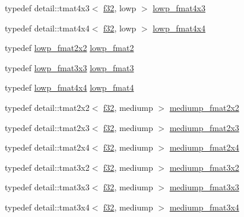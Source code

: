 \begin{CompactItemize}
\item 
typedef detail::tmat4x3$<$ \hyperlink{group__gtc__type__precision_g0ec999b57f5330d9021256e96038df04}{f32}, lowp $>$ \hyperlink{group__gtc__type__precision_ga4df4f3adcc8eb3bed680b14a87fb2c4}{lowp\_\-fmat4x3}
\item 
typedef detail::tmat4x4$<$ \hyperlink{group__gtc__type__precision_g0ec999b57f5330d9021256e96038df04}{f32}, lowp $>$ \hyperlink{group__gtc__type__precision_g9ff955b170643f547661d2e7263ee426}{lowp\_\-fmat4x4}
\item 
typedef \hyperlink{group__gtc__type__precision_g99367a30c64035d7e7f76410105d10e3}{lowp\_\-fmat2x2} \hyperlink{group__gtc__type__precision_g9bafb192cb7327d543ad55be2e6e675c}{lowp\_\-fmat2}
\item 
typedef \hyperlink{group__gtc__type__precision_g25b389b52269f3256f015b4fff5789c2}{lowp\_\-fmat3x3} \hyperlink{group__gtc__type__precision_g88ae00cab6aae48d56700915c7799973}{lowp\_\-fmat3}
\item 
typedef \hyperlink{group__gtc__type__precision_g9ff955b170643f547661d2e7263ee426}{lowp\_\-fmat4x4} \hyperlink{group__gtc__type__precision_g00dfb85ec53bb5f173747f73d13c1b8b}{lowp\_\-fmat4}
\item 
typedef detail::tmat2x2$<$ \hyperlink{group__gtc__type__precision_g0ec999b57f5330d9021256e96038df04}{f32}, mediump $>$ \hyperlink{group__gtc__type__precision_ge9af1d96efbaeeb5c5edd9c7b0a24fa5}{mediump\_\-fmat2x2}
\item 
typedef detail::tmat2x3$<$ \hyperlink{group__gtc__type__precision_g0ec999b57f5330d9021256e96038df04}{f32}, mediump $>$ \hyperlink{group__gtc__type__precision_gae7081e19f495e7cdbf727e1550b95a8}{mediump\_\-fmat2x3}
\item 
typedef detail::tmat2x4$<$ \hyperlink{group__gtc__type__precision_g0ec999b57f5330d9021256e96038df04}{f32}, mediump $>$ \hyperlink{group__gtc__type__precision_g8f793d90a5a6bea23c13ad195fcb5de2}{mediump\_\-fmat2x4}
\item 
typedef detail::tmat3x2$<$ \hyperlink{group__gtc__type__precision_g0ec999b57f5330d9021256e96038df04}{f32}, mediump $>$ \hyperlink{group__gtc__type__precision_g40681f25413b8705b16da2f534692f59}{mediump\_\-fmat3x2}
\item 
typedef detail::tmat3x3$<$ \hyperlink{group__gtc__type__precision_g0ec999b57f5330d9021256e96038df04}{f32}, mediump $>$ \hyperlink{group__gtc__type__precision_ga7f015dd5b962a658178bb881d4620cc}{mediump\_\-fmat3x3}
\item 
typedef detail::tmat3x4$<$ \hyperlink{group__gtc__type__precision_g0ec999b57f5330d9021256e96038df04}{f32}, mediump $>$ \hyperlink{group__gtc__type__precision_gfa5aaa948365f349840dfeb9eeebf0cd}{mediump\_\-fmat3x4}

\end{CompactItemize}
